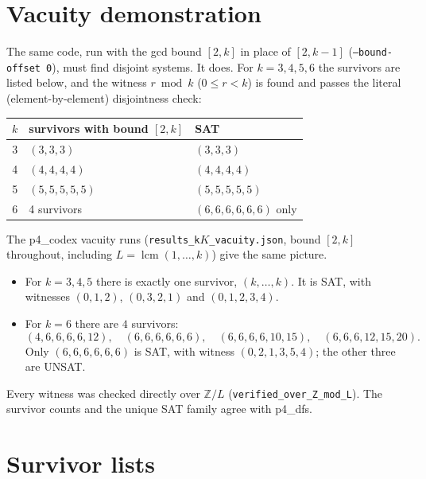 \documentclass[11pt]{article}
\theoremstyle{definition}
\theoremstyle{remark}
\begin{document}
\section{Vacuity demonstration}

The same code, run with the gcd bound $[2,k]$ in place of $[2,k-1]$ (\texttt{--bound-offset 0}),
must find disjoint systems. It does. For $k=3,4,5,6$ the survivors are listed below, and the
witness $r\bmod k$ ($0\le r<k$) is found and passes the literal (element-by-element)
disjointness check:
\begin{center}
\begin{tabular}{r|l|l}
$k$ & survivors with bound $[2,k]$ & SAT\\ \hline
3 & $(3,3,3)$ & $(3,3,3)$\\
4 & $(4,4,4,4)$ & $(4,4,4,4)$\\
5 & $(5,5,5,5,5)$ & $(5,5,5,5,5)$\\
6 & 4 survivors & $(6,6,6,6,6,6)$ only
\end{tabular}
\end{center}
The p4\_codex vacuity runs (\texttt{results\_k$K$\_vacuity.json}, bound $[2,k]$ throughout,
including $L=\operatorname{lcm}(1,\dots,k)$) give the same picture.
\begin{itemize}
\item For $k=3,4,5$ there is exactly one survivor, $(k,\dots,k)$. It is SAT, with witnesses
  $(0,1,2)$, $(0,3,2,1)$ and $(0,1,2,3,4)$.
\item For $k=6$ there are $4$ survivors:
  \[(4,6,6,6,6,12),\quad(6,6,6,6,6,6),\quad(6,6,6,6,10,15),\quad(6,6,6,12,15,20).\]
  Only $(6,6,6,6,6,6)$ is SAT, with witness $(0,2,1,3,5,4)$; the other three are UNSAT.
\end{itemize}
Every witness was checked directly over $\mathbb{Z}/L$ (\texttt{verified\_over\_Z\_mod\_L}).
The survivor counts and the unique SAT family agree with p4\_dfs.

\section{Survivor lists}
\end{document}
